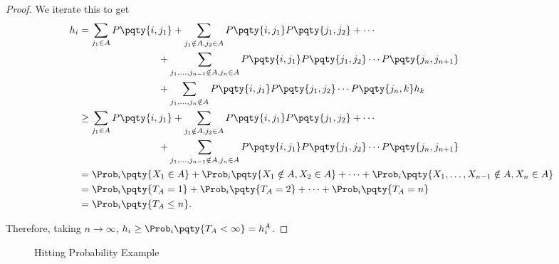 \begin{proof}
    We iterate this to get
    \begin{align*}
        h_i &= \sum_{j_1 \in A} P\pqty{i, j_1} + \sum_{j_1 \notin A, j_2 \in A} P\pqty{i, j_1} P\pqty{j_1, j_2} + \cdots \\
        &\hspace{8em} + \sum_{j_1, \ldots, j_{n - 1} \notin A, j_{n} \in A} P\pqty{i, j_1} P\pqty{j_1, j_2} \cdots P\pqty{j_n, j_{n + 1}} \\
        &\hspace{8em} + \sum_{j_1, \ldots, j_n \notin A} P\pqty{i, j_1} P\pqty{j_1, j_2} \cdots P\pqty{j_n, k} h_k \\
        &\geq \sum_{j_1 \in A} P\pqty{i, j_1} + \sum_{j_1 \notin A, j_2 \in A} P\pqty{i, j_1} P\pqty{j_1, j_2} + \cdots \\
        &\hspace{8em} + \sum_{j_1, \ldots, j_{n - 1} \notin A, j_{n} \in A} P\pqty{i, j_1} P\pqty{j_1, j_2} \cdots P\pqty{j_n, j_{n + 1}} \\
        &= \Prob_i \pqty{X_1 \in A} + \Prob_i \pqty{X_1 \notin A, X_2 \in A} + \cdots + \Prob_i \pqty{X_1, \ldots, X_{n - 1} \notin A, X_{n} \in A} \\
        &= \Prob_i \pqty{T_A = 1} + \Prob_i \pqty{T_A = 2} + \cdots + \Prob_i \pqty{T_A = n} \\
        &= \Prob_i \pqty{T_A \leq n}.
    \end{align*}

    Therefore, taking \(n \to \infty\), \(h_i \geq \Prob_i \pqty{T_A < \infty} = h_i^A\).
\end{proof}

\begin{figure}[ht!]
    \centering
    \caption{Hitting Probability Example}
    \label{fig:hitting-probability-example}%
\end{figure}

